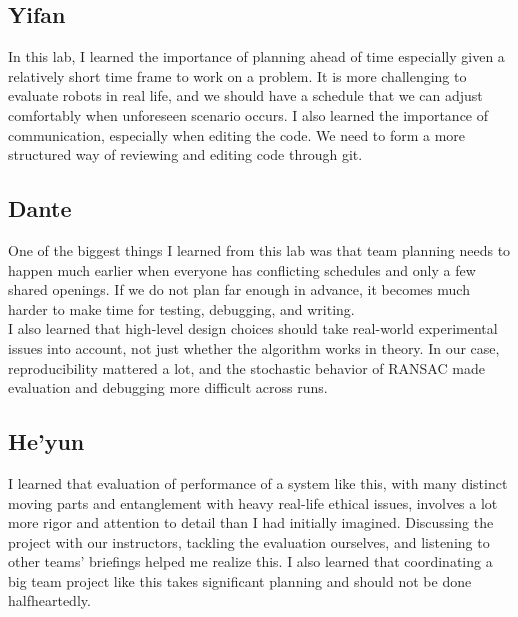 \documentclass{article}
\begin{document}
\subsection{Yifan}
In this lab, I learned the importance of planning ahead of time especially given a relatively short time frame to work on a problem. It is more challenging to evaluate robots in real life, and we should have a schedule that we can adjust comfortably when unforeseen scenario occurs. I also learned the importance of communication, especially when editing the code. We need to form a more structured way of reviewing and editing code through git. 
\subsection{Dante}
One of the biggest things I learned from this lab was that team planning needs to happen much earlier when everyone has conflicting schedules and only a few shared openings. If we do not plan far enough in advance, it becomes much harder to make time for testing, debugging, and writing. \\

I also learned that high-level design choices should take real-world experimental issues into account, not just whether the algorithm works in theory. In our case, reproducibility mattered a lot, and the stochastic behavior of RANSAC made evaluation and debugging more difficult across runs.
\subsection{He'yun}
I learned that evaluation of performance of a system like this, with many distinct moving parts and entanglement with heavy real-life ethical issues, involves a lot more rigor and attention to detail than I had initially imagined. Discussing the project with our instructors, tackling the evaluation ourselves, and listening to other teams' briefings helped me realize this. I also learned that coordinating a big team project like this takes significant planning and should not be done halfheartedly. 


\end{document}
